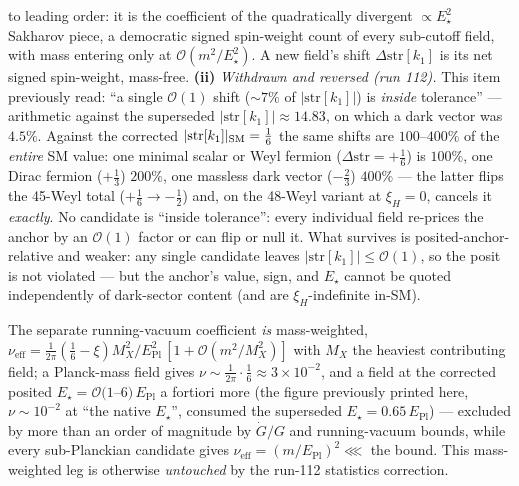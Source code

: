 \documentclass[11pt]{article}
\newcommand{\Epl}{E_{\mathrm{Pl}}}
\newcommand{\str}{\mathrm{str}}
\begin{document}
to leading order: it is the coefficient of the quadratically divergent
$\propto E_\star^2$ Sakharov piece, a democratic signed spin-weight count of every
sub-cutoff field, with mass entering only at $\mathcal O(m^2/E_\star^2)$. A new
field's shift $\Delta\str[k_1]$ is its net signed spin-weight, mass-free.
\textbf{(ii)} \emph{Withdrawn and reversed (run 112).} This item previously read: ``a
single $\mathcal O(1)$ shift ($\sim7\%$ of $|\str[k_1]|$) is \emph{inside} tolerance'' ---
arithmetic against the superseded $|\str[k_1]|\approx14.83$, on which a dark vector was
$4.5\%$. Against the corrected $|\str[k_1]|_{\rm SM}=\tfrac16$ the same shifts are
$100$--$400\%$ of the \emph{entire} SM value: one minimal scalar or Weyl fermion
($\Delta\str=+\tfrac16$) is $100\%$, one Dirac fermion ($+\tfrac13$) $200\%$, one massless
dark vector ($-\tfrac23$) $400\%$ --- the latter flips the 45-Weyl total
($+\tfrac16\to-\tfrac12$) and, on the 48-Weyl variant at $\xi_H=0$, cancels it
\emph{exactly}. No candidate is ``inside tolerance'': every individual field re-prices the
anchor by an $\mathcal O(1)$ factor or can flip or null it. What survives is
posited-anchor-relative and weaker: any single candidate leaves $|\str[k_1]|\le\mathcal
O(1)$, so the posit is not violated --- but the anchor's value, sign, and $E_\star$ cannot
be quoted independently of dark-sector content (and are $\xi_H$-indefinite in-SM).

\smallskip\noindent
The separate running-vacuum coefficient \emph{is} mass-weighted,
$\nu_{\mathrm{eff}}=\tfrac1{2\pi}(\tfrac16-\xi)M_X^2/\Epl^2\,[1+\mathcal
O(m^2/M_X^2)]$ with $M_X$ the heaviest contributing field; a Planck-mass field gives
$\nu\sim\tfrac1{2\pi}\cdot\tfrac16\approx3\times10^{-2}$, and a field at the corrected
posited $E_\star=\mathcal O(1$--$6)\,\Epl$ a fortiori more (the figure previously printed
here, $\nu\sim10^{-2}$ at ``the native $E_\star$'', consumed the superseded
$E_\star=0.65\,\Epl$) --- excluded by more than an order of magnitude by $\dot G/G$ and
running-vacuum bounds, while every sub-Planckian candidate gives
$\nu_{\mathrm{eff}}=(m/\Epl)^2\lll$ the bound. This mass-weighted leg is otherwise
\emph{untouched} by the run-112 statistics correction.
\end{document}
